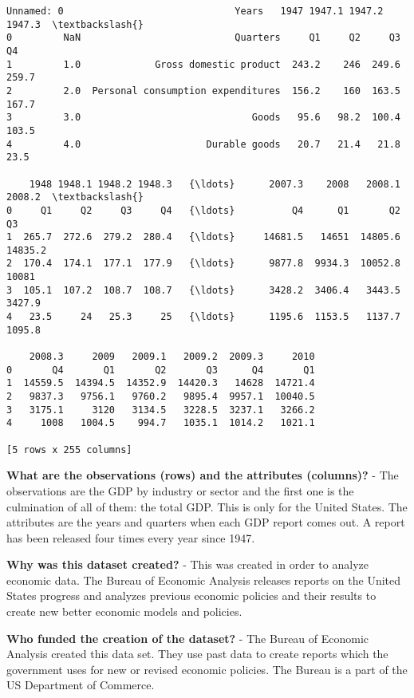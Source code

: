 \documentclass[11pt]{article}
\begin{document}
    \begin{Verbatim}[commandchars=\\\{\}]
   Unnamed: 0                              Years   1947 1947.1 1947.2 1947.3  \textbackslash{}
0         NaN                           Quarters     Q1     Q2     Q3     Q4   
1         1.0             Gross domestic product  243.2    246  249.6  259.7   
2         2.0  Personal consumption expenditures  156.2    160  163.5  167.7   
3         3.0                              Goods   95.6   98.2  100.4  103.5   
4         4.0                      Durable goods   20.7   21.4   21.8   23.5   

    1948 1948.1 1948.2 1948.3   {\ldots}      2007.3    2008   2008.1   2008.2  \textbackslash{}
0     Q1     Q2     Q3     Q4   {\ldots}          Q4      Q1       Q2       Q3   
1  265.7  272.6  279.2  280.4   {\ldots}     14681.5   14651  14805.6  14835.2   
2  170.4  174.1  177.1  177.9   {\ldots}      9877.8  9934.3  10052.8    10081   
3  105.1  107.2  108.7  108.7   {\ldots}      3428.2  3406.4   3443.5   3427.9   
4   23.5     24   25.3     25   {\ldots}      1195.6  1153.5   1137.7   1095.8   

    2008.3     2009   2009.1   2009.2  2009.3     2010  
0       Q4       Q1       Q2       Q3      Q4       Q1  
1  14559.5  14394.5  14352.9  14420.3   14628  14721.4  
2   9837.3   9756.1   9760.2   9895.4  9957.1  10040.5  
3   3175.1     3120   3134.5   3228.5  3237.1   3266.2  
4     1008   1004.5    994.7   1035.1  1014.2   1021.1  

[5 rows x 255 columns]

    \end{Verbatim}

    \textbf{What are the observations (rows) and the attributes (columns)?}
- The observations are the GDP by industry or sector and the first one
is the culmination of all of them: the total GDP. This is only for the
United States. The attributes are the years and quarters when each GDP
report comes out. A report has been released four times every year since
1947.

\textbf{Why was this dataset created?} - This was created in order to
analyze economic data. The Bureau of Economic Analysis releases reports
on the United States progress and analyzes previous economic policies
and their results to create new better economic models and policies.

\textbf{Who funded the creation of the dataset?} - The Bureau of
Economic Analysis created this data set. They use past data to create
reports which the government uses for new or revised economic policies.
The Bureau is a part of the US Department of Commerce.
\end{document}
